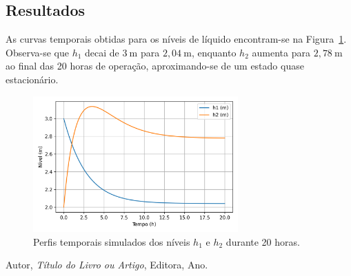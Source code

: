 \documentclass{article}
\begin{document}
\subsection*{Resultados}
As curvas temporais obtidas para os níveis de líquido encontram-se na Figura~\ref{fig:questao1}. Observa-se que $h_1$ decai de $3\ \mathrm{m}$ para $2{,}04\ \mathrm{m}$, enquanto $h_2$ aumenta para $2{,}78\ \mathrm{m}$ ao final das 20 horas de operação, aproximando-se de um estado quase estacionário.

\begin{figure}[h!]
  \centering
  \includegraphics[width=0.7\textwidth]{figuras/questao1_niveis.png}
  \caption{Perfis temporais simulados dos níveis $h_1$ e $h_2$ durante 20 horas.}
  \label{fig:questao1}
\end{figure}
\begin{thebibliography}{9}
  Autor, \emph{Título do Livro ou Artigo}, Editora, Ano.
\end{thebibliography}
\end{document}
